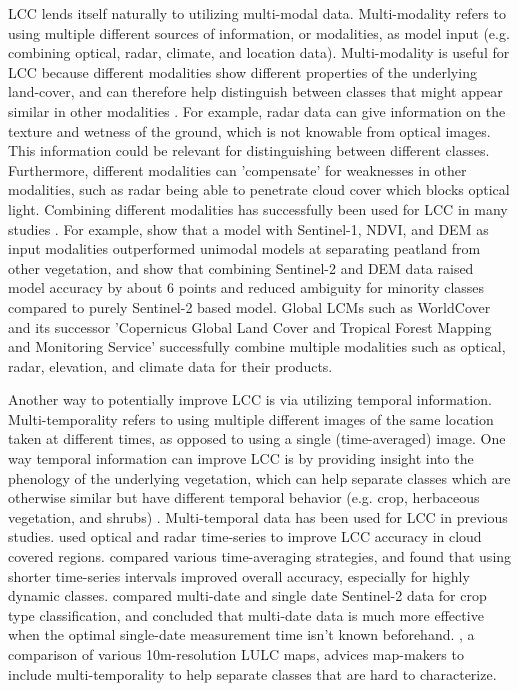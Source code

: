 \documentclass[a4paper,12pt]{article}
\begin{document}
\ac{LCC} lends itself naturally to utilizing multi-modal data. Multi-modality refers to using multiple different sources of information, or modalities, as model input (e.g. combining optical, radar, climate, and location data). Multi-modality is useful for \ac{LCC} because different modalities show different properties of the underlying land-cover, and can therefore help distinguish between classes that might appear similar in other modalities \citep{joshiReviewApplicationOptical2016}. For example, radar data can give information on the texture and wetness of the ground, which is not knowable from optical images. This information could be relevant for distinguishing between different classes. Furthermore, different modalities can 'compensate' for weaknesses in other modalities, such as radar being able to penetrate cloud cover which blocks optical light. Combining different modalities has successfully been used for \ac{LCC} in many studies \citep{joshiReviewApplicationOptical2016}.
For example, \citet{mahlasiEcologicalMappingGeospatial2026} show that a model with Sentinel-1, \ac{NDVI}, and \ac{DEM} as input modalities outperformed unimodal models at separating peatland from other vegetation, and \citet{shanduEnhancingLandCover2026} show that combining Sentinel-2 and \ac{DEM} data raised model accuracy by about 6 points and reduced ambiguity for minority classes compared to purely Sentinel-2 based model. Global \acp{LCM} such as WorldCover \citep{zanagaESAWorldCover102022} and its successor 'Copernicus Global Land Cover and Tropical Forest Mapping and Monitoring Service' \citep{JRC2026ATBDLCM10} successfully combine multiple modalities such as optical, radar, elevation, and climate data for their products.

Another way to potentially improve \ac{LCC} is via utilizing temporal information. Multi-temporality refers to using multiple different images of the same location taken at different times, as opposed to using a single (time-averaged) image. One way temporal information can improve \ac{LCC} is by providing insight into the phenology of the underlying vegetation, which can help separate classes which are otherwise similar but have different temporal behavior (e.g. crop, herbaceous vegetation, and shrubs) \citep{mullerMiningDenseLandsat2015}. Multi-temporal data has been used for \ac{LCC} in previous studies. \citet{lopesImprovingAccuracyLand2020} used optical and radar time-series to improve \ac{LCC} accuracy in cloud covered regions. \citet{griffithsIntraannualReflectanceComposites2019} compared various time-averaging strategies, and found that using shorter time-series intervals improved overall accuracy, especially for highly dynamic classes. \citet{vuoloHowMuchDoes2018} compared multi-date and single date Sentinel-2 data for crop type classification, and concluded that multi-date data is much more effective when the optimal single-date measurement time isn't known beforehand. \citet{xuComparativeValidationRecent2024}, a comparison of various 10m-resolution \ac{LULC} maps, advices map-makers to include multi-temporality to help separate classes that are hard to characterize.
\end{document}
